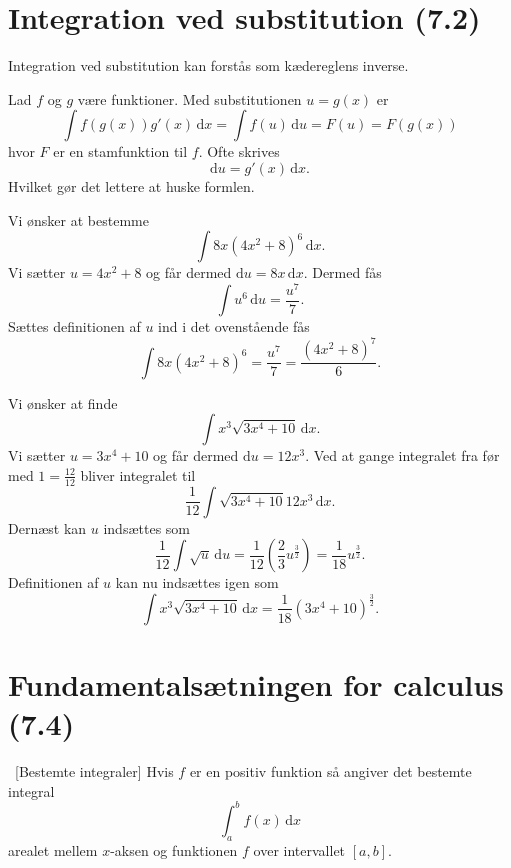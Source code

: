 
\section{Integration ved substitution (7.2)} \label{afs:intsub}
Integration ved substitution kan forstås som kædereglens inverse. 
\begin{definition} 
  Lad $f$ og $g$ være funktioner. Med substitutionen $u = g(x)$ er
  \[ 
  \int f(g(x))g'(x)\, \mathrm{d}x = \int f(u) \, \mathrm{d}u = F(u) = F(g(x))
  \]
  hvor $F$ er en stamfunktion til $f$. Ofte skrives
  \[ 
  \mathrm{d}u = g'(x) \, \mathrm{d}x 
  .\]
  Hvilket gør det lettere at huske formlen.
\end{definition}

\begin{eks} 
  Vi ønsker at bestemme
  \[ 
  \int 8x \left( 4x^2 + 8 \right)^{6} \, \mathrm{d}x
  .\]
  Vi sætter $u = 4x^2 + 8$ og får dermed $\mathrm{d}u = 8x \, \mathrm{d}x$. Dermed fås
  \[ 
  \int u^{6} \, \mathrm{d}u = \frac{u^{7}}{7}
  .\]
  Sættes definitionen af $u$ ind i det ovenstående fås
  \[ 
  \int 8x \left( 4x^2 + 8 \right)^{6} = \frac{u^{7}}{7} = \frac{\left( 4x^2 + 8 \right)^{7}}{6}
  .\]
\end{eks}

\begin{eks} 
  Vi ønsker at finde
  \[ 
  \int x^3 \sqrt{3x^{4} + 10} \, \mathrm{d}x 
  .\]
  Vi sætter $u = 3x^{4} + 10$ og får dermed $\mathrm{d}u = 12x^3$. Ved at gange integralet fra før med $1 = \frac{12}{12}$ bliver integralet til
  \[ 
  \frac{1}{12}\int \sqrt{3x^{4} + 10} 12x^3 \, \mathrm{d}x
  .\]
  Dernæst kan $u$ indsættes som
  \[ 
  \frac{1}{12} \int \sqrt{u} \, \mathrm{d}u = \frac{1}{12} \left( \frac{2}{3} u^{\frac{3}{2}} \right) = \frac{1}{18} u^{\frac{3}{2}}
  .\]
  Definitionen af $u$ kan nu indsættes igen som
  \[ 
  \int x^3 \sqrt{3x^{4} + 10} \, \mathrm{d}x = \frac{1}{18} \left( 3x^{4} + 10 \right)^{\frac{3}{2}}
  .\]
\end{eks}

\section{Fundamentalsætningen for calculus (7.4)}

\begin{definition} [Bestemte integraler]
  Hvis $f$ er en positiv funktion så angiver det bestemte integral 
  \[ 
  \int_{a}^{b} f(x) \, \mathrm{d}x 
  \]
  arealet mellem $x$-aksen og funktionen $f$ over intervallet $[a,b]$.
\end{definition}

